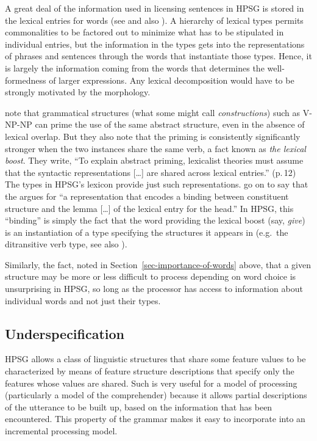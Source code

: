 \documentclass[output=paper
 	        ,biblatex
                ,babelshorthands
                ,newtxmath
                ,draftmode
                ,colorlinks, citecolor=brown
]{langscibook}
\begin{document}
\largerpage\enlargethispage{5pt}
A great deal of the information used in licensing sentences in HPSG is stored in
the lexical entries for words (see \citealp{MWArgSt} and also
).  A hierarchy of lexical
types permits commonalities to be factored out to minimize what has to be
stipulated in individual entries, but the information in the types gets into the representations of
phrases and sentences through the words that instantiate those types. Hence, it is largely the
information coming from the words that determines the well-formedness of larger expressions.  Any
lexical decomposition would have to be strongly motivated by the morphology.

\citet[Section~2.3]{BraniganPickering2017} note that grammatical structures (what some might call
\emph{constructions}) such as V-NP-NP can prime the use of the same abstract
structure, even in the absence of lexical overlap.  But they also note that the priming is
consistently significantly stronger when the two instances share the same verb, a fact known as
\emph{the lexical boost}.  They write, ``To explain abstract priming, lexicalist
theories must assume that the syntactic representations [\ldots] are shared across lexical
entries.'' (p.\,12) The types in HPSG's lexicon provide just such
representations. \citeauthor{BraniganPickering2017} go on to say that the  argues
for ``a representation that encodes a binding between constituent structure and the lemma [\ldots]
of the lexical entry for the head.''  In HPSG, this ``binding'' is simply the fact that the word
providing the lexical boost (say, \emph{give}) is an instantiation of a type specifying the
structures it appears in (e.g.\ the ditransitive verb type, see also \citealp*{YKD2019a-u}).

Similarly, the fact, noted in Section~\ref{sec-importance-of-words} above, that a given structure
may be more or less difficult to process depending on word choice is unsurprising in HPSG, so long
as the processor has access to information about individual words and not just their types.    

\subsection{Underspecification}

HPSG allows a class of linguistic structures that share some feature values to be characterized by
means of feature structure descriptions that specify only the features whose values are shared.
Such  is very useful for a model of processing (particularly a model of the
comprehender) because it allows partial descriptions of the utterance to be built up, based on the
information that has been encountered.  This property of the grammar makes it easy to incorporate
into an incremental processing model.
\end{document}
